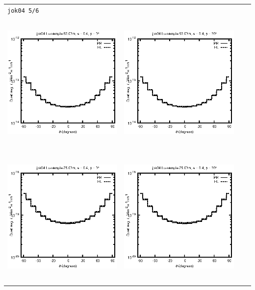 \begin{tabular}{c c c c}
\multicolumn{4}{l}{\texttt{jok04 5/6}} \\
\includegraphics[height=7cm]{../eps/jok04_Lu_sample_50.00m_fwd.eps} &
\includegraphics[height=7cm]{../eps/jok04_Lu_sample_50.00m_cross.eps} \\
\includegraphics[height=7cm]{../eps/jok04_Lu_sample_75.00m_fwd.eps} &
\includegraphics[height=7cm]{../eps/jok04_Lu_sample_75.00m_cross.eps} \\

\end{tabular}
